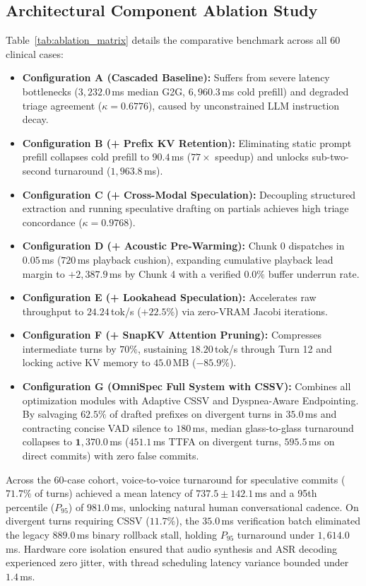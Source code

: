 \documentclass[10pt,journal,compsoc]{IEEEtran}
\begin{document}
\subsection{Architectural Component Ablation Study}
Table~\ref{tab:ablation_matrix} details the comparative benchmark across all 60 clinical cases:
\begin{itemize}
    \item \textbf{Configuration A (Cascaded Baseline):} Suffers from severe latency bottlenecks ($3{,}232.0$\,ms median G2G, $6{,}960.3$\,ms cold prefill) and degraded triage agreement ($\kappa = 0.6776$), caused by unconstrained LLM instruction decay.
    \item \textbf{Configuration B (+ Prefix KV Retention):} Eliminating static prompt prefill collapses cold prefill to $90.4$\,ms ($77\times$ speedup) and unlocks sub-two-second turnaround ($1{,}963.8$\,ms).
    \item \textbf{Configuration C (+ Cross-Modal Speculation):} Decoupling structured extraction and running speculative drafting on partials achieves high triage concordance ($\kappa = 0.9768$).
    \item \textbf{Configuration D (+ Acoustic Pre-Warming):} Chunk 0 dispatches in $0.05$\,ms ($720$\,ms playback cushion), expanding cumulative playback lead margin to $+2{,}387.9$\,ms by Chunk 4 with a verified $0.0\%$ buffer underrun rate.
    \item \textbf{Configuration E (+ Lookahead Speculation):} Accelerates raw throughput to $24.24$\,tok/s ($+22.5\%$) via zero-VRAM Jacobi iterations.
    \item \textbf{Configuration F (+ SnapKV Attention Pruning):} Compresses intermediate turns by $70\%$, sustaining $18.20$\,tok/s through Turn 12 and locking active KV memory to $45.0$\,MB ($-85.9\%$).
    \item \textbf{Configuration G (OmniSpec Full System with CSSV):} Combines all optimization modules with Adaptive CSSV and Dyspnea-Aware Endpointing. By salvaging $62.5\%$ of drafted prefixes on divergent turns in $35.0$\,ms and contracting concise VAD silence to $180$\,ms, median glass-to-glass turnaround collapses to $\mathbf{1{,}370.0}$\,ms ($451.1$\,ms TTFA on divergent turns, $595.5$\,ms on direct commits) with zero false commits.
\end{itemize}

Across the 60-case cohort, voice-to-voice turnaround for speculative commits ($71.7\%$ of turns) achieved a mean latency of $737.5 \pm 142.1$\,ms and a 95th percentile ($P_{95}$) of $981.0$\,ms, unlocking natural human conversational cadence. On divergent turns requiring CSSV ($11.7\%$), the $35.0$\,ms verification batch eliminated the
legacy $889.0$\,ms binary rollback stall, holding $P_{95}$ turnaround under $1{,}614.0$\,ms. Hardware core isolation ensured that audio synthesis and ASR decoding experienced zero jitter, with thread scheduling latency variance bounded under $1.4$\,ms.
\end{document}
